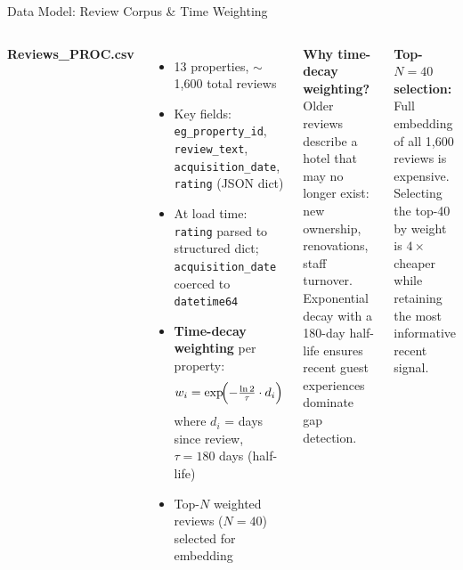 \documentclass[aspectratio=169,10pt]{beamer}
\begin{document}
\begin{frame}{Data Model: Review Corpus \& Time Weighting}
\begin{columns}[T]
\textbf{Reviews\_PROC.csv}
\begin{itemize}
  \item 13 properties, $\sim$1{,}600 total reviews
  \item Key fields: \texttt{eg\_property\_id}, \texttt{review\_text},
        \texttt{acquisition\_date}, \texttt{rating} (JSON dict)
  \item At load time: \texttt{rating} parsed to structured dict;
        \texttt{acquisition\_date} coerced to \texttt{datetime64}
  \item \textbf{Time-decay weighting} per property:
        \[w_i = \exp\!\Bigl(-\tfrac{\ln 2}{\tau}\cdot d_i\Bigr)\]
        where $d_i$ = days since review, $\tau = 180$ days (half-life)
  \item Top-$N$ weighted reviews ($N=40$) selected for embedding
\end{itemize}

\textbf{Why time-decay weighting?}\\[0.3em]
\small
Older reviews describe a hotel that may no longer exist: new ownership,
renovations, staff turnover. Exponential decay with a 180-day half-life
ensures recent guest experiences dominate gap detection.

\medskip
\textbf{Top-$N=40$ selection:}
Full embedding of all 1{,}600 reviews is expensive.
Selecting the top-40 by weight is $4\times$ cheaper while retaining
the most informative recent signal.
\end{columns}
\end{frame}
\end{document}
